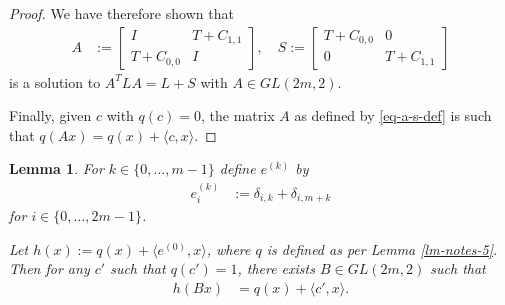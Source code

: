\documentclass[12pt,a4paper]{article}
\newtheorem{Lemma}{Lemma}
\begin{document}
\begin{proof}
We have therefore shown that
\begin{align}
A
&:=
\left[
\begin{array}{cc}
I & T + C_{1,1}
\\
T + C_{0,0} & I
\end{array}
\right],
\quad
S
:=
\left[
\begin{array}{cc}
T + C_{0,0} & 0
\\
0 & T + C_{1,1}
\end{array}
\right]
\label{eq-a-s-def}
\end{align}
is a solution to $A^T L A = L + S$ with $A \in GL(2 m, 2)$.

Finally, given $c$ with $q(c)=0$, the matrix $A$ as defined by \eqref{eq-a-s-def} is such that
$q(A x) = q(x) + \langle c, x \rangle$.
\end{proof}

\begin{Lemma}
\label{lm-notes-6}
For $k \in \{0,\ldots,m-1\}$ define $e^{(k)}$ by
\begin{align}
e_i^{(k)} &:= \delta_{i,k} + \delta_{i,m+k}
\label{eq-e-def}
\end{align}
for $i \in \{0,\ldots,2 m - 1\}$.

Let $h(x) := q(x) + \langle e^{(0)}, x \rangle$, where $q$ is defined as per Lemma \ref{lm-notes-5}.
Then for any $c'$ such that $q(c')=1$, there exists $B \in GL(2 m, 2)$ such that
\begin{align}
h(B x) &= q(x) + \langle c',x \rangle.
\label{eq-h-B-x}
\end{align}
\end{Lemma}
\end{document}
